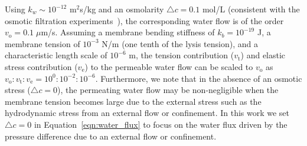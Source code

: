 \documentclass[prb,preprint,showpacs,preprintnumbers,amsmath,amssymb,longbibliography]{revtex4-1}
\begin{document}
Using $k_w\sim 10^{-12}$ m$^2$s/kg 
and an osmolarity $\triangle c = 0.1$ mol/L (consistent with the osmotic
filtration experiments~\cite{OlbrichRawiczNeedhamEtAl2000_BJ}), the
corresponding water flow is of the order $v_\mathrm{o}=0.1 \; \mu$m/s.
Assuming a membrane bending stiffness of $k_b = 10^{-19}$ J, a membrane
tension of $10^{-3}$ N/m (one tenth of the lysis tension), and a
characteristic length scale of $10^{-6}$ m, the tension contribution
($v_\mathrm{t}$) and elastic stress contribution ($v_\mathrm{e}$) to the
permeable water flow can be scaled to $v_\mathrm{o}$ as
$v_\mathrm{o}:v_\mathrm{t}:v_\mathrm{e}=10^{0}:10^{-2}:10^{-6}$.
Furthermore, we note that in the absence of an osmotic stress
($\triangle c = 0$), the permeating water flow may be non-negligible
when the membrane tension becomes large due to the external stress such
as the hydrodynamic stress from an external flow or confinement. In this
work we set $\triangle c = 0$ in Equation~\eqref{eqn:water_flux} to
focus on the water flux driven by the pressure difference due to an
external flow or confinement.

\end{document}
